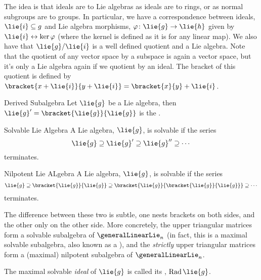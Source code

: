\documentclass[fleqn]{NotesClass}
\DeclareMathOperator{\Rad}{Rad}
\begin{document}
    The idea is that ideals are to Lie algebras as ideals are to rings, or as normal subgroups are to groups.
    In particular, we have a correspondence between ideals, \(\lie{i} \subseteq g\) and Lie algebra morphisms, \(\varphi \colon \lie{g} \to \lie{h}\) given by \(\lie{i} \leftrightarrow \ker \varphi\) (where the kernel is defined as it is for any linear map).
    We also have that \(\lie{g}/\lie{i}\) is a well defined quotient and a Lie algebra.
    Note that the quotient of any vector space by a subspace is again a vector space, but it's only a Lie algebra again if we quotient by an ideal.
    The bracket of this quotient is defined by \(\bracket{x + \lie{i}}{y + \lie{i}} = \bracket{x}{y} + \lie{i}\).
    
    \begin{dfn}{Derived Subalgebra}{}
        Let \(\lie{g}\) be a Lie algebra, then \(\lie{g}' = \bracket{\lie{g}}{\lie{g}}\) is the .
    \end{dfn}
    
    \begin{dfn}{Solvable Lie Algebra}{}
        A Lie algebra, \(\lie{g}\), is solvable if the series
        \begin{equation}
            \lie{g} \supseteq \lie{g}' \supseteq \lie{g}'' \supseteq \dotsb
        \end{equation}
        terminates.
    \end{dfn}
    
    \begin{dfn}{Nilpotent Lie ALgebra}{}
        A Lie algebra, \(\lie{g}\), is solvable if the series
        \begin{equation}
            \lie{g} \supseteq \bracket{\lie{g}}{\lie{g}} \supseteq \bracket{\lie{g}}{\bracket{\lie{g}}{\lie{g}}} \supseteq \dotsb
        \end{equation}
        terminates.
    \end{dfn}
    
    The difference between these two is subtle, one nests brackets on both sides, and the other only on the other side.
    More concretely, the upper triangular matrices form a solvable subalgebra of \(\generalLinearLie_n\) (in fact, this is a maximal solvable subalgebra, also known as a ), and the \emph{strictly} upper triangular matrices form a (maximal) nilpotent subalgebra of \(\generalLinearLie_n\).
    
    \begin{dfn}{}{}
        The maximal solvable \emph{ideal} of \(\lie{g}\) is called its , \(\Rad \lie{g}\).
    \end{dfn}
    
\end{document}
